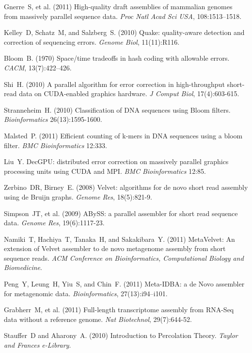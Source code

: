 \documentclass{pnastwo}
\begin{document}
\begin{article}
\begin{thebibliography}{10}
 Gnerre~S, et al. (2011) High-quality draft assemblies 
of mammalian genomes from massively parallel sequence data. {\it Proc Natl 
Acad Sci USA}, 108:1513--1518.

 Kelley~D, Schatz~M, and Salzberg~S. (2010) Quake: 
quality-aware detection and correction of sequencing errors. {\it Genome 
Biol}, 11(11):R116.

 Bloom~B. (1970) Space/time tradeoffs in hash coding with 
allowable errors. {\it CACM}, 13(7):422--426.

 Shi~H. (2010) A parallel algorithm for error correction 
in high-throughput short-read data on CUDA-enabled graphics hardware. {\it 
J Comput Biol}, 17(4):603-615.

 Stranneheim~H. (2010) Classification of DNA sequences 
using Bloom filters. {\it Bioinformatics} 26(13):1595-1600.

 Malsted~P. (2011) Efficient counting of k-mers in DNA 
sequences using a bloom filter. {\it BMC Bioinformatics} 12:333.

 Liu~Y. DecGPU: distributed error correction on 
massively parallel graphics processing units using CUDA and MPI. {\it 
BMC Bioinformatics} 12:85.

 Zerbino~DR, Birney~E. (2008) Velvet: algorithms for de novo 
short read assembly using de Bruijn graphs. {\it Genome Res}, 18(5):821-9.

 Simpson~JT, et al. (2009) ABySS: a parallel assembler for 
short read sequence data. {\it Genome Res}, 19(6):1117-23.

 Namiki~T, Hachiya~T, Tanaka~H, and Sakakibara~Y. (2011) 
MetaVelvet: An extension of Velvet assembler to de novo metagenome assembly 
from short sequence reads. {\it ACM Conference on Bioinformatics, 
Computational Biology and Biomedicine}.

 Peng~Y, Leung~H, Yiu~S, and Chin~F. (2011) Meta-IDBA: 
a de Novo assembler for metagenomic data. {\it Bioinformatics}, 
27(13):i94--i101.

 Grabherr~M, et al. (2011) Full-length transcriptome assembly 
from RNA-Seq data without a reference genome. {\it Nat Biotechnol}, 
29(7):644-52.

 Stauffer~D and Aharony~A. (2010) Introduction to 
Percolation Theory. {\it Taylor and Frances e-Library}.


\end{thebibliography}
\end{article}
\end{document}

